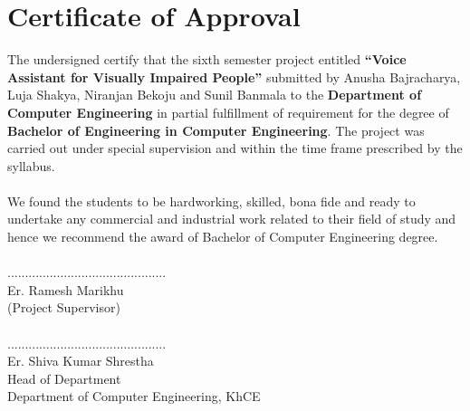 		\large
			\chapter*{Certificate of Approval}
		\normalsize 
		    The undersigned certify that the sixth semester project entitled \textbf{“Voice Assistant for Visually Impaired People”} submitted by Anusha Bajracharya, Luja Shakya, Niranjan Bekoju and Sunil Banmala to the \textbf{Department of Computer Engineering} in partial fulfillment of requirement for the degree of \textbf{Bachelor of Engineering in Computer Engineering}. The project was carried out under special supervision and within the time frame prescribed by the syllabus. \\ 
		    \\
			We found the students to be hardworking, skilled, bona fide and ready to undertake any commercial and industrial work related to their field of study and hence we recommend the award of Bachelor of Computer Engineering degree. \\
			\vspace{2cm} \\
			.............................................\\
			Er. Ramesh Marikhu\\
			(Project Supervisor)\\
			\vspace{1cm}\\
			.............................................\\
			Er. Shiva Kumar Shrestha\\
			Head of Department \\
			Department of Computer Engineering, KhCE\\
		\break



		\large
